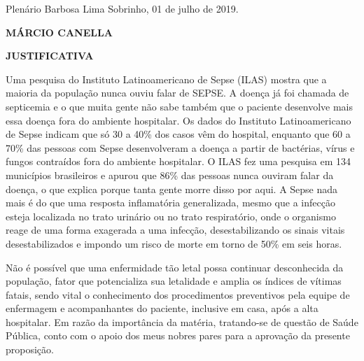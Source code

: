 \documentclass[10pt]{article}
\begin{document}
\begin{center}
  Plenário Barbosa Lima Sobrinho, 01 de julho de 2019.

   \bigskip

  \textbf{ MÁRCIO CANELLA}

  \bigskip

  \textbf{JUSTIFICATIVA}
  \bigskip

\end{center}

  
Uma pesquisa do Instituto Latinoamericano de Sepse (ILAS) mostra que a maioria da população nunca ouviu falar de SEPSE. A doença já foi chamada de septicemia e o que muita gente não sabe também que o paciente desenvolve mais essa doença fora do ambiente hospitalar. Os dados do Instituto Latinoamericano de Sepse indicam que só 30 a 40\% dos casos vêm do hospital, enquanto que 60 a 70\% das pessoas com Sepse desenvolveram a doença a partir de bactérias, vírus e fungos contraídos fora do ambiente hospitalar.  O ILAS fez uma pesquisa em 134 municípios brasileiros e apurou que 86\% das pessoas nunca ouviram falar da doença, o que explica porque tanta gente morre disso por aqui.  A Sepse nada mais é do que uma resposta inflamatória generalizada, mesmo que a infecção esteja localizada no trato urinário ou no trato respiratório, onde o organismo reage de uma forma exagerada a uma infecção, desestabilizando os sinais vitais desestabilizados e impondo um risco de morte em torno de 50\% em seis horas.

Não é possível que uma enfermidade tão letal possa continuar desconhecida da população, fator que potencializa sua letalidade e amplia os índices de vítimas fatais, sendo vital o conhecimento dos procedimentos preventivos pela equipe de enfermagem e acompanhantes do paciente, inclusive em casa, após a alta hospitalar.   Em razão da importância da matéria, tratando-se de questão de Saúde Pública, conto com o apoio dos meus nobres pares para a aprovação da presente proposição.



\iffalse
\begin{center}
  \textbf{REFERÊNCIAS}
\end{center}


\fi
\end{document}
